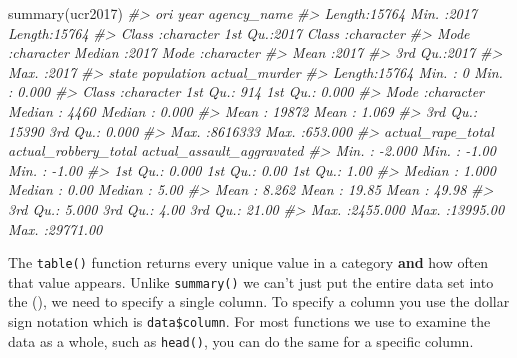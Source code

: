 \documentclass[
]{krantz}
\makeatletter
\newenvironment{Shaded}{\begin{snugshade}}{\end{snugshade}}
\newcommand{\CommentTok}[1]{\textcolor[rgb]{0.37,0.37,0.37}{\textit{#1}}}
\newcommand{\FunctionTok}[1]{\textcolor[rgb]{0,0,0}{#1}}
\newcommand{\NormalTok}[1]{#1}
\newenvironment{kframe}{%
\medskip{}
\setlength{\fboxsep}{.8em}
 \def\at@end@of@kframe{}%
 \ifinner\ifhmode%
  \def\at@end@of@kframe{\end{minipage}}%
  \begin{minipage}{\columnwidth}%
 \fi\fi%
 \def\FrameCommand##1{\hskip\@totalleftmargin \hskip-\fboxsep
 \colorbox{shadecolor}{##1}\hskip-\fboxsep
     \hskip-\linewidth \hskip-\@totalleftmargin \hskip\columnwidth}%
 \MakeFramed {\advance\hsize-\width
   \@totalleftmargin\z@ \linewidth\hsize
   \@setminipage}}%
 {\par\unskip\endMakeFramed%
 \at@end@of@kframe}
\renewenvironment{Shaded}{\begin{kframe}}{\end{kframe}}
\makeatother
\begin{document}
\begin{Shaded}
\begin{Highlighting}[]
\FunctionTok{summary}\NormalTok{(ucr2017)}
\CommentTok{\#\textgreater{}      ori                 year      agency\_name       }
\CommentTok{\#\textgreater{}  Length:15764       Min.   :2017   Length:15764      }
\CommentTok{\#\textgreater{}  Class :character   1st Qu.:2017   Class :character  }
\CommentTok{\#\textgreater{}  Mode  :character   Median :2017   Mode  :character  }
\CommentTok{\#\textgreater{}                     Mean   :2017                     }
\CommentTok{\#\textgreater{}                     3rd Qu.:2017                     }
\CommentTok{\#\textgreater{}                     Max.   :2017                     }
\CommentTok{\#\textgreater{}     state             population      actual\_murder    }
\CommentTok{\#\textgreater{}  Length:15764       Min.   :      0   Min.   :  0.000  }
\CommentTok{\#\textgreater{}  Class :character   1st Qu.:    914   1st Qu.:  0.000  }
\CommentTok{\#\textgreater{}  Mode  :character   Median :   4460   Median :  0.000  }
\CommentTok{\#\textgreater{}                     Mean   :  19872   Mean   :  1.069  }
\CommentTok{\#\textgreater{}                     3rd Qu.:  15390   3rd Qu.:  0.000  }
\CommentTok{\#\textgreater{}                     Max.   :8616333   Max.   :653.000  }
\CommentTok{\#\textgreater{}  actual\_rape\_total  actual\_robbery\_total actual\_assault\_aggravated}
\CommentTok{\#\textgreater{}  Min.   :  {-}2.000   Min.   :   {-}1.00     Min.   :   {-}1.00         }
\CommentTok{\#\textgreater{}  1st Qu.:   0.000   1st Qu.:    0.00     1st Qu.:    1.00         }
\CommentTok{\#\textgreater{}  Median :   1.000   Median :    0.00     Median :    5.00         }
\CommentTok{\#\textgreater{}  Mean   :   8.262   Mean   :   19.85     Mean   :   49.98         }
\CommentTok{\#\textgreater{}  3rd Qu.:   5.000   3rd Qu.:    4.00     3rd Qu.:   21.00         }
\CommentTok{\#\textgreater{}  Max.   :2455.000   Max.   :13995.00     Max.   :29771.00}
\end{Highlighting}
\end{Shaded}

The \texttt{table()} function returns every unique value in a category \textbf{and} how often that value appears. Unlike \texttt{summary()} we can't just put the entire data set into the (), we need to specify a single column. To specify a column you use the dollar sign notation which is \texttt{data\$column}. For most functions we use to examine the data as a whole, such as \texttt{head()}, you can do the same for a specific column.
\end{document}
